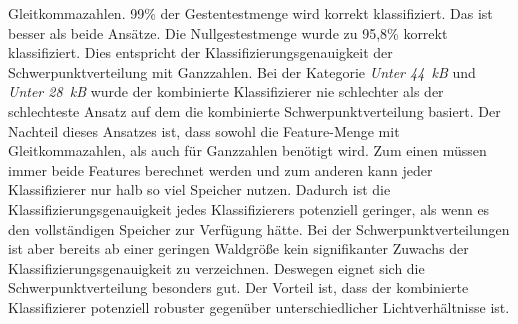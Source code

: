 Gleitkommazahlen. 99\% der Gestentestmenge wird korrekt klassifiziert. Das ist besser als beide Ansätze. Die Nullgestestmenge wurde zu 95,8\% korrekt klassifiziert. Dies entspricht der Klassifizierungsgenauigkeit der
Schwerpunktverteilung mit Ganzzahlen. Bei der Kategorie \textit{Unter 44~kB} und \textit{Unter 28~kB} wurde der kombinierte Klassifizierer nie schlechter als der schlechteste Ansatz auf dem die kombinierte
Schwerpunktverteilung basiert.
\newline
\newline
Der Nachteil dieses Ansatzes ist, dass sowohl die Feature-Menge mit Gleitkommazahlen, als auch für Ganzzahlen benötigt wird. Zum einen müssen immer beide Features berechnet werden und zum anderen kann jeder Klassifizierer
nur halb so viel Speicher nutzen. Dadurch ist die Klassifizierungsgenauigkeit jedes Klassifizierers potenziell geringer, als wenn es den vollständigen Speicher zur Verfügung hätte. Bei der Schwerpunktverteilungen ist aber
bereits ab einer geringen Waldgröße kein signifikanter Zuwachs der Klassifizierungsgenauigkeit zu verzeichnen. Deswegen eignet sich die Schwerpunktverteilung besonders gut. Der Vorteil ist, dass der kombinierte
Klassifizierer potenziell robuster gegenüber unterschiedlicher Lichtverhältnisse ist.

